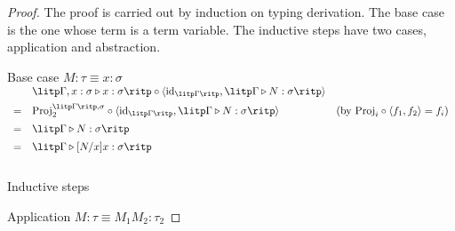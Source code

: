 \begin{proof}
The proof is carried out by induction on typing derivation. The base case is the one whose term is a term variable. The inductive steps have two cases, application and abstraction.

Base case $ M: \tau \equiv x: \sigma $ \\[5pt]
$
\begin{array}{rll}
   & \litp \Gamma , x: \sigma \triangleright x: \sigma \ritp \circ \langle \text{id}_{\litp \Gamma \ritp} , \litp \Gamma \triangleright N: \sigma \ritp \rangle & \\[5pt]
 = & \text{Proj}_2^{\litp \Gamma \ritp , \sigma} \circ \langle \text{id}_{\litp \Gamma \ritp} , \litp \Gamma \triangleright N: \sigma \ritp \rangle & (\text{by } \text{Proj}_i \circ \langle f_1, f_2 \rangle = f_i ) \\[5pt]
 = & \litp \Gamma \triangleright N: \sigma \ritp & \\[5pt]
 = & \litp \Gamma \triangleright [N/x]x: \sigma \ritp & \\[10pt]
\end{array}
$

Inductive steps

Application $ M: \tau \equiv M_1 M_2 : \tau_2 $


\end{proof}
